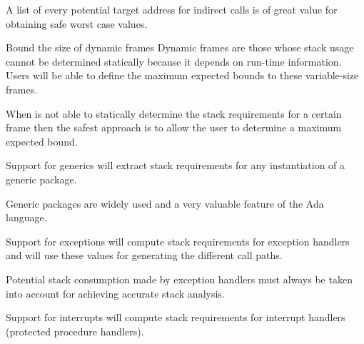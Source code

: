 \begin{rationale}
  A list of every potential target address for indirect calls is of
  great value for obtaining safe worst case values.
\end{rationale}

\begin{requirement}{Bound the size of dynamic frames}
  Dynamic frames are those whose stack usage cannot be determined
  statically because it depends on run-time information. Users will be
  able to define the maximum expected bounds to these variable-size
  frames.
\end{requirement}

\begin{rationale}
  When \ssat{} is not able to statically determine the stack
  requirements for a certain frame then the safest approach is to
  allow the user to determine a maximum expected bound.
\end{rationale}

\begin{requirement}{Support for generics}
  \ssat{} will extract stack requirements for any instantiation of a
  generic package.
\end{requirement}

\begin{rationale}
  Generic packages are widely used and a very valuable feature of the
  Ada language.
\end{rationale}

\begin{requirement}{Support for exceptions}
  \ssat{} will compute stack requirements for exception handlers and
  will use these values for generating the different call paths.
\end{requirement}

\begin{rationale}
  Potential stack consumption made by exception handlers must always
  be taken into account for achieving accurate stack analysis. 
\end{rationale}

\begin{requirement}{Support for interrupts}
  \ssat{} will compute stack requirements for interrupt handlers
  (protected procedure handlers).
\end{requirement}

